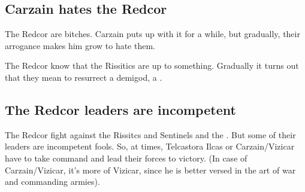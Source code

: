 \subsection{Carzain hates the Redcor}
The Redcor are bitches. Carzain puts up with it for a while, but gradually, their arrogance makes him grow to hate them. 

The Redcor know that the Rissitics are up to something. Gradually it turns out that they mean to resurrect a \daemonic{} demigod, a \Haskelek{}. 









\subsection{The Redcor leaders are incompetent}
The Redcor fight against the Rissitcs and Sentinels and the \Haskelek. But some of their leaders are incompetent fools. So, at times, Telcastora Ilcas or Carzain/Vizicar have to take command and lead their forces to victory. (In case of Carzain/Vizicar, it's more of Vizicar, since he is better versed in the art of war and commanding armies). 

